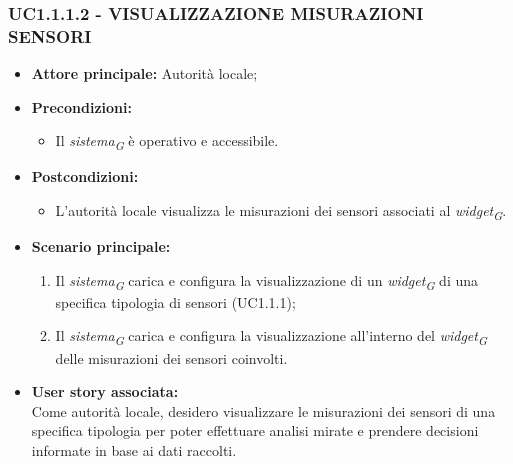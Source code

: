 \subsubsection{UC1.1.1.2 - VISUALIZZAZIONE MISURAZIONI SENSORI}
\begin{itemize}
    \item \textbf{Attore principale:} Autorità locale;
    \item \textbf{Precondizioni:}
        \begin{itemize}
            \item Il \textit{sistema}\textsubscript{\textit{G}} è operativo e accessibile.
        \end{itemize}
    \item \textbf{Postcondizioni:}
        \begin{itemize}
            \item  L'autorità locale visualizza le misurazioni dei sensori associati al \textit{widget}\textsubscript{\textit{G}}.
        \end{itemize}
    \item \textbf{Scenario principale:}
        \begin{enumerate}
            \item Il \textit{sistema}\textsubscript{\textit{G}} carica e configura la visualizzazione di un \textit{widget}\textsubscript{\textit{G}} di una specifica tipologia di sensori (UC1.1.1);
            \item Il \textit{sistema}\textsubscript{\textit{G}} carica e configura la visualizzazione all'interno del \textit{widget}\textsubscript{\textit{G}} delle misurazioni dei sensori coinvolti.
        \end{enumerate}
    \item \textbf{User story associata:} \\
        Come autorità locale, desidero visualizzare le misurazioni dei sensori di una specifica tipologia per poter effettuare analisi mirate e prendere decisioni informate in base ai dati raccolti.
\end{itemize}
